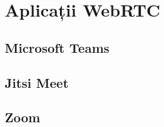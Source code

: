 \chapter{Aplicații WebRTC}
\label{chap:ch4}

\section{Microsoft Teams}
\label{chap:ch4sec1}

\section{Jitsi Meet}
\label{chap:ch4sec2}

\section{Zoom}
\label{chap:ch4sec3}